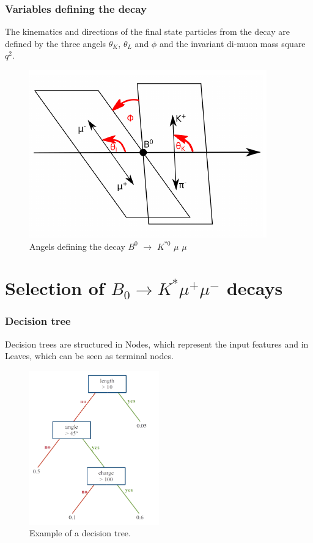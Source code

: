\documentclass{beamer}
\begin{document}
\begin{frame}
  \frametitle{Variables defining the decay}

The kinematics and directions of the final state particles from the decay are defined by the three angels $\theta_K$, $\theta_L$ and $\phi$ and the invariant di-muon mass square $q^2$.

  \begin{figure}
   \includegraphics[width= 0.8\linewidth]{figures/angels}
   \caption{Angels defining the decay $B^0$ $\rightarrow$ $K^{*0}$ $\mu$ $\mu$}
  \end{figure}

\end{frame}


\section{Selection of $B_0 \rightarrow K^* \mu^+ \mu^-$ decays}



\begin{frame}
  \frametitle{Decision tree}

Decision trees are structured in Nodes, which represent the input features and in Leaves, which can be seen as terminal nodes.

  \begin{figure}
   \includegraphics[width=0.5\textwidth]{figures/decision_tree}
   \caption{Example of a decision tree.}
   \label{fig:tree}
  \end{figure}
\end{frame}
\end{document}
